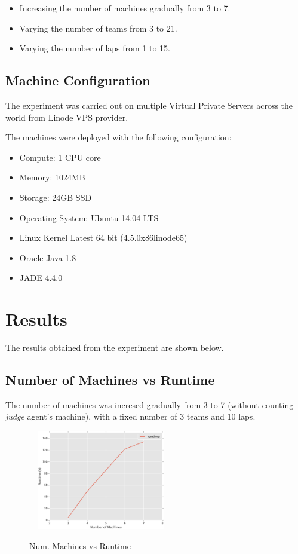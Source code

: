 \documentclass[11pt,titlepage]{article}
\newlength{\offsetpage}
\newenvironment{widepage}{
	\begin{adjustwidth}{-\offsetpage}{-\offsetpage}%
    \addtolength{\textwidth}{2\offsetpage}}%
	{\end{adjustwidth}
}
\begin{document}
\begin{itemize}
	\item Increasing the number of machines gradually from 3 to 7.
	\item Varying the number of teams from 3 to 21.
	\item Varying the number of laps from 1 to 15.
\end{itemize}

\subsection{Machine Configuration}
The experiment was carried out on multiple Virtual Private Servers across the world from Linode VPS provider. 

The machines were deployed with the following configuration:

\begin{itemize}
	\item Compute: 1 CPU core
	\item Memory: 1024MB
	\item Storage: 24GB SSD
	\item Operating System: Ubuntu 14.04 LTS
	\item Linux Kernel Latest 64 bit (4.5.0\textendash x86\textendash linode65)
	\item Oracle Java 1.8
	\item JADE 4.4.0
\end{itemize}

\newpage
\section{Results}

The results obtained from the experiment are shown below.

\subsection{Number of Machines vs Runtime}

The number of machines was incresed gradually from 3 to 7 (without counting \emph{judge} agent's machine), with a fixed number of 3 teams and 10 laps.

\begin{figure}[H]
	\begin{widepage}
		\centering
		\includegraphics[width=0.5\textwidth]{machines.eps}
	\end{widepage}
	\caption{Num. Machines vs Runtime}
	\label{fig:Macs-Runtime}
\end{figure}
\end{document}
